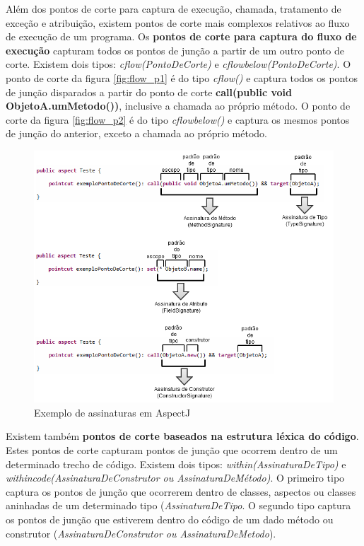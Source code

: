 Além dos pontos de corte para captura de execução, chamada, tratamento de exceção e atribuição, existem pontos de corte mais complexos relativos ao
fluxo de execução de um programa. Os \textbf{pontos de corte para captura do fluxo de execução} capturam todos os pontos de junção a partir de um outro ponto de
corte. Existem dois tipos: \textit{cflow(PontoDeCorte)} e \textit{cflowbelow(PontoDeCorte)}. O ponto de corte da figura \ref{fig:flow_p1}
é do tipo \textit{cflow()} e captura todos os pontos de junção disparados a partir do ponto de corte \textbf{call(public void ObjetoA.umMetodo())},
inclusive a chamada ao próprio método. O ponto de corte da figura \ref{fig:flow_p2} é do tipo \textit{cflowbelow()} e captura os mesmos pontos de
junção do anterior, exceto a chamada ao próprio método.

\begin{figure}[!htb]
	\centering
	\includegraphics{img/signatures.png}
	\caption{Exemplo de assinaturas em AspectJ}\label{fig:signatures}
\end{figure}

Existem também \textbf{pontos de corte baseados na estrutura léxica do código}. Estes pontos de corte capturam pontos de junção que ocorrem dentro de
um determinado trecho de código. Existem dois tipos: \textit{within(AssinaturaDeTipo)} e \textit{withincode(AssinaturaDeConstrutor ou
AssinaturaDeMétodo)}. O primeiro tipo captura os pontos de junção que ocorrerem dentro de classes, aspectos ou classes aninhadas de um determinado
tipo (\textit{AssinaturaDeTipo}. O segundo tipo captura os pontos de junção que estiverem dentro do código de um dado método ou construtor
(\textit{AssinaturaDeConstrutor ou AssinaturaDeMetodo}). 

